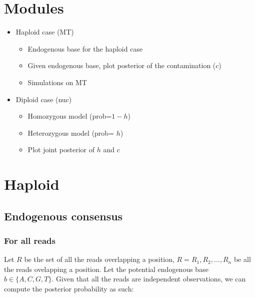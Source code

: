 \documentclass[a4paper,12pt]{article}
\begin{document}


\section{Modules}

\begin{itemize} 
\item Haploid case (MT)
\begin{itemize} 
\item Endogenous base for the haploid case 
\item Given endogenous base, plot posterior of the contamination ($c$)
\item Simulations on MT
\end{itemize}
\item Diploid case (nuc)
\begin{itemize} 
\item Homozygous model (prob=$1-h$)
\item Heterozygous model  (prob= $h$)
\item Plot joint posterior of $h$ and $c$
\end{itemize}
\end{itemize}

\section{Haploid}


\subsection{Endogenous consensus}
\subsubsection{For all reads}

\noindent Let $R$ be the set of all the reads overlapping a position, $R={R_1,R_2,...,R_n}$ be all the reads ovelapping a position.  Let the potential endogenous base $b\in\{A,C,G,T\}$. Given that all the reads are independent observations, we can compute the posterior probability as such:
\end{document}

